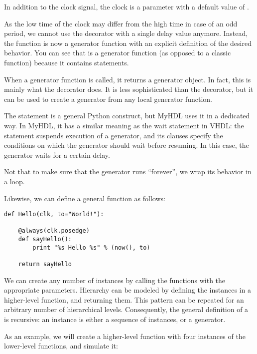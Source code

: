 In addition to the clock signal, the clock
 is a parameter with a default value of .

As the low time of the clock may differ from the high time in case of
an odd period, we cannot use the  decorator with a
single delay value anymore. Instead, the  function
is now a generator function with an explicit definition of the desired
behavior. You can see that  is a generator function (as
opposed to a classic function) because it contains 
statements.

When a generator function is called, it returns a generator object. In
fact, this is mainly what the  decorator does. It
is less sophisticated than the  decorator,
but it can be used to create a generator from any local generator
function.

The  statement is a general Python construct, but MyHDL
uses it in a dedicated way.  In MyHDL, it has a similar meaning as the
wait statement in VHDL: the statement suspends execution of a
generator, and its clauses specify the conditions on which the
generator should wait before resuming. In this case, the generator
waits for a certain delay.

Not that to make sure that the generator runs ``forever'', we wrap its
behavior in a  loop.

Likewise, we can define a general  function as follows:

\begin{verbatim}
def Hello(clk, to="World!"):

    @always(clk.posedge)
    def sayHello():
        print "%s Hello %s" % (now(), to)

    return sayHello
\end{verbatim}


We can create any number of instances by calling the functions with
the appropriate parameters. Hierarchy can be modeled by defining the
instances in a higher-level function, and returning them.
This pattern can be repeated for an arbitrary number of
hierarchical levels. Consequently, the general definition
of a \myhdl\  is recursive: an instance
is either a sequence of instances, or a generator.

As an example, we will create a higher-level function with
four instances of the lower-level functions, and simulate it:

